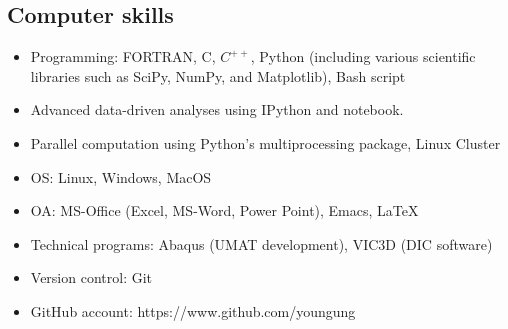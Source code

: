 \documentclass{res}
\begin{document}
\begin{resume}
  \subsection{Computer skills}
  \begin{itemize}
  \item Programming: FORTRAN, C, $C^{++}$, Python (including various scientific libraries such as SciPy, NumPy, and Matplotlib), Bash script
  \item Advanced data-driven analyses using IPython and notebook.
  \item Parallel computation using Python's multiprocessing package, Linux Cluster
  \item OS: Linux, Windows, MacOS
  \item OA: MS-Office (Excel, MS-Word, Power Point), Emacs, \LaTeX
  \item Technical programs: Abaqus (UMAT development), VIC3D (DIC software)
  \item Version control: Git
  \item GitHub account: https://www.github.com/youngung
  \end{itemize}


\end{resume}
\end{document}
